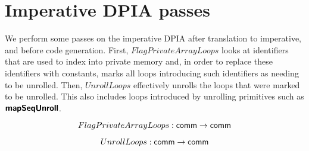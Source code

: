 \clearpage
\section{Imperative DPIA passes}

We perform some passes on the imperative DPIA after translation to imperative, and before code generation. First, $FlagPrivateArrayLoops$ looks at identifiers that are used to index into private memory and, in order to replace these identifiers with constants, marks all loops introducing such identifiers as needing to be unrolled. Then, $UnrollLoops$ effectively unrolls the loops that were marked to be unrolled. This also includes loops introduced by unrolling primitives such as $\bm{\mathsf{mapSeqUnroll}}$.

$$ FlagPrivateArrayLoops: \mathsf{comm} \to \mathsf{comm} $$

$$ UnrollLoops: \mathsf{comm} \to \mathsf{comm} $$

